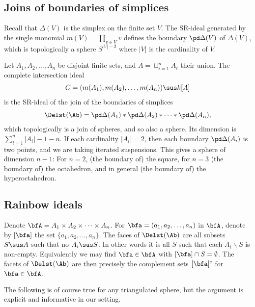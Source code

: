 \setcounter{section}{3}\setcounter{subsection}{0}\setcounter{cdrthm}{0}\setcounter{equation}{3}
\subsection{Joins of boundaries of simplices}
Recall that $\Delta(V)$ is the simplex on the finite set $V$. 
The SR-ideal generated by the single monomial $m(V) = \prod_{v \in V} v$
defines the
boundary $\pd \Delta(V)$ of $\Delta(V)$, which is topologically
a sphere $S^{|V|-2}$ where $|V|$ is the cardinality of $V$. 

Let  $A_1, A_2, \ldots, A_n$ be disjoint finite sets, and $A = \sqcup_{i=1}^n A_i$
their union. The complete intersection ideal
\begin{equation*}
  C = (m(A_1), m(A_2), \ldots, m(A_n))  \sus k[A]
\end{equation*}
is the SR-ideal of the join
of the boundaries of simplices
\begin{equation} \label{eq:liaison-join}
  \Delst(\Ab) = \pd \Delta(A_1) * \pd \Delta(A_2) * \cdots * \pd \Delta(A_n),
 \end{equation}
which topologically is a join of spheres, and so also a sphere.
Its dimension is $\sum_{i = 1}^n |A_i| -1-n$. If each cardinality
$|A_i| = 2$, then each boundary $\pd \Delta(A_i)$ is two points,
and we are taking iterated suspensions. This gives a sphere
of dimension $n-1$: For $n = 2$, (the boundary of) the square,
for $n = 3$
(the boundary of) the octahedron, and in general
(the boundary of) the hyperoctahedron.

\subsection{Rainbow ideals}
Denote $\bfA = A_1 \times A_2 \times \cdots \times A_n$.
For $\bfa = (a_1, a_2, \ldots, a_n)$ in $\bfA$, denote
by $[\bfa ]$ the set $\{a_1, a_2, \ldots, a_n \}$. 
The faces of $\Delst(\Ab)$ are all subsets $S \sus A$ such
that no $A_i \sus S$. In other words it is all $S$ such that
each $A_i \backslash S$ is non-empty. Equivalently we 
may find $\bfa \in \bfA$ with $[\bfa] \cap S = \emptyset$.
The facets of $\Delst(\Ab)$ are then precisely
the complement sets $[\bfa]^c$ for $\bfa \in \bfA$.

The following is of course true for any triangulated sphere, but the argument
is explicit and informative in our setting.


